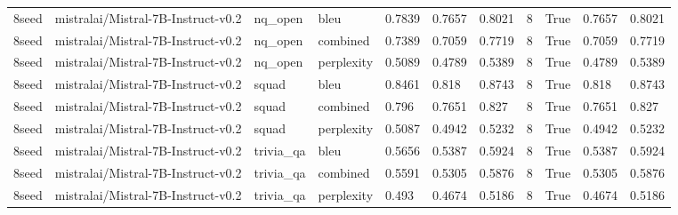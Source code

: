 \begin{tabular}{lllllllllll}
8seed & mistralai/Mistral-7B-Instruct-v0.2 & nq\_open & bleu & 0.7839 & 0.7657 & 0.8021 & 8 & True & 0.7657 & 0.8021 \\
8seed & mistralai/Mistral-7B-Instruct-v0.2 & nq\_open & combined & 0.7389 & 0.7059 & 0.7719 & 8 & True & 0.7059 & 0.7719 \\
8seed & mistralai/Mistral-7B-Instruct-v0.2 & nq\_open & perplexity & 0.5089 & 0.4789 & 0.5389 & 8 & True & 0.4789 & 0.5389 \\
8seed & mistralai/Mistral-7B-Instruct-v0.2 & squad & bleu & 0.8461 & 0.818 & 0.8743 & 8 & True & 0.818 & 0.8743 \\
8seed & mistralai/Mistral-7B-Instruct-v0.2 & squad & combined & 0.796 & 0.7651 & 0.827 & 8 & True & 0.7651 & 0.827 \\
8seed & mistralai/Mistral-7B-Instruct-v0.2 & squad & perplexity & 0.5087 & 0.4942 & 0.5232 & 8 & True & 0.4942 & 0.5232 \\
8seed & mistralai/Mistral-7B-Instruct-v0.2 & trivia\_qa & bleu & 0.5656 & 0.5387 & 0.5924 & 8 & True & 0.5387 & 0.5924 \\
8seed & mistralai/Mistral-7B-Instruct-v0.2 & trivia\_qa & combined & 0.5591 & 0.5305 & 0.5876 & 8 & True & 0.5305 & 0.5876 \\
8seed & mistralai/Mistral-7B-Instruct-v0.2 & trivia\_qa & perplexity & 0.493 & 0.4674 & 0.5186 & 8 & True & 0.4674 & 0.5186 \\
\bottomrule
\end{tabular}
